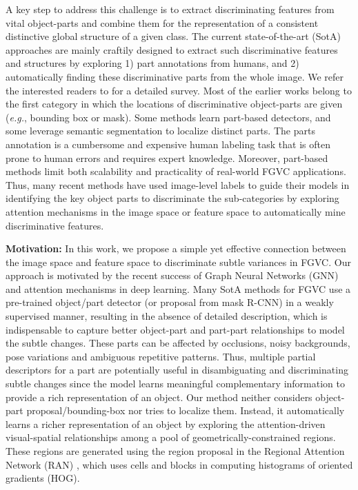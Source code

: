 \documentclass[journal]{IEEEtran}
\begin{document}
A key step to address this challenge is to extract discriminating features from vital object-parts and combine them for the representation of a consistent distinctive global structure of a given class. The current state-of-the-art (SotA) approaches are mainly craftily designed to extract such discriminative features and structures by exploring 1) part annotations from humans, and 2) automatically finding these discriminative parts from the whole image. We refer the interested readers to \cite{wei2021fine} for a detailed survey. Most of the earlier works belong to the first category in which the locations of discriminative object-parts are given (\textit{e.g.}, bounding box or mask). Some methods learn part-based detectors, and some leverage semantic segmentation to localize distinct parts. The parts annotation is a cumbersome and expensive human labeling task that is often prone to human errors and requires expert knowledge. Moreover, part-based methods limit both scalability and practicality of real-world FGVC applications. Thus, many recent methods have used image-level labels to guide their models in identifying the key object parts to discriminate the sub-categories  
by exploring attention mechanisms in the image space or feature space \cite{behera2021context, behera2020regional, liu2019bidirectional,  bera2021attend} to automatically mine discriminative features. 

\noindent\textbf{Motivation: }
In this work, we propose a simple yet effective connection between the image space and feature space to discriminate subtle variances in FGVC. Our approach is motivated by the recent success of Graph Neural Networks (GNN) \cite{kipf2016semi} and attention mechanisms \cite{vaswani2017attention,BahdanauCB14} in deep learning. Many SotA methods for FGVC use a  pre-trained object/part detector (or proposal from mask R-CNN) in a weakly supervised manner, resulting in the absence of detailed description, which is indispensable to capture better object-part and part-part relationships to model the subtle changes. These parts can be affected by occlusions, noisy backgrounds, pose variations and ambiguous repetitive patterns. Thus, multiple partial descriptors for a  part are potentially useful in disambiguating and discriminating subtle changes since the model learns meaningful complementary information to provide a rich representation of an object. Our method neither considers object-part proposal/bounding-box nor tries to localize them. Instead, it automatically learns a richer representation of an object by exploring the attention-driven visual-spatial relationships among a pool of geometrically-constrained regions. These regions are generated using the region proposal in the Regional Attention Network (RAN) \cite{behera2020regional}, which uses cells and blocks in computing histograms of oriented gradients (HOG). 
\end{document}
